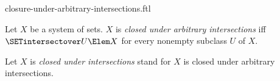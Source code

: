 \documentclass{stex}
\begin{document}
\begin{smodule}{closure-under-arbitrary-intersections.ftl}

\begin{definition}[forthel,id=FOUNDATIONS_14_2369621166391296]
  Let $X$ be a system of sets.
  $X$ is \emph{closed under arbitrary intersections} iff $\SETintersectover U \Elem X$ for every nonempty subclass $U$ of $X$.

  Let $X$ is \emph{closed under intersections} stand for $X$ is closed under arbitrary intersections.
\end{definition}
\end{smodule}
\end{document}
